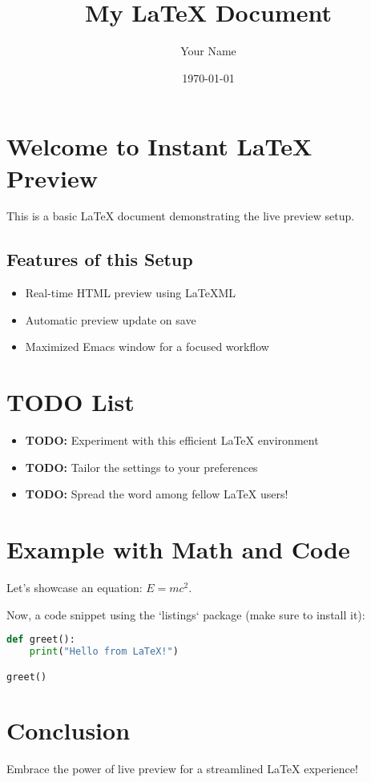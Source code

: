 \documentclass{article}
\title{My LaTeX Document}
\author{Your Name}
\date{\today}
\begin{document}
\maketitle

\section{Welcome to Instant LaTeX Preview}

This is a basic LaTeX document demonstrating the live preview setup. 

\subsection{Features of this Setup}
\begin{itemize}
    \item Real-time HTML preview using LaTeXML
    \item Automatic preview update on save
    \item Maximized Emacs window for a focused workflow 
\end{itemize}

\section{TODO List}
\begin{itemize}
    \item \textbf{TODO:} Experiment with this efficient LaTeX environment
    \item \textbf{TODO:}  Tailor the settings to your preferences
    \item \textbf{TODO:}  Spread the word among fellow LaTeX users!
\end{itemize}

\section{Example with Math and Code}

Let's showcase an equation:  $E=mc^2$.

Now, a code snippet using the `listings` package (make sure to install it):

\usepackage{listings}

\begin{lstlisting}[language=Python]
def greet():
    print("Hello from LaTeX!")

greet() 
\end{lstlisting}

\section{Conclusion}
Embrace the power of live preview for a streamlined LaTeX experience! 
\end{document}
